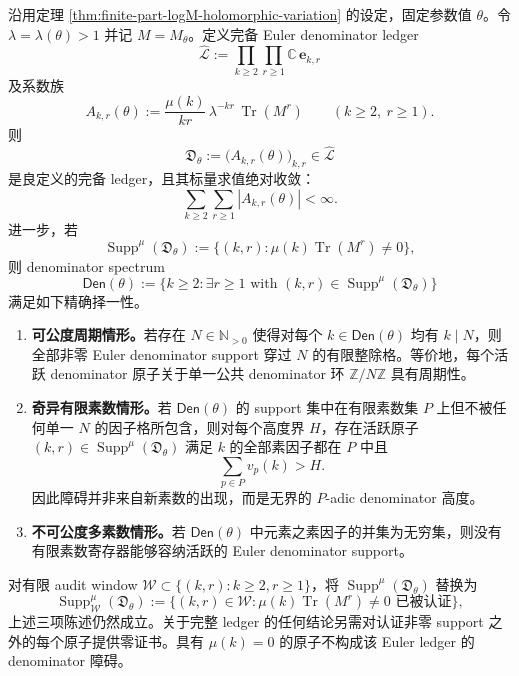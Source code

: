 \begin{theorem}\label{distill:euclid_elements-proportion_and_denominator_spectrum_families-zeta-completed-denominator-ledger-alternative}
沿用定理 \ref{thm:finite-part-logM-holomorphic-variation} 的设定，固定参数值 \(\theta\)。令 \(\lambda=\lambda(\theta)>1\) 并记 \(M=M_\theta\)。定义完备 Euler denominator ledger
\[
\widehat{\mathcal L}:=\prod_{k\ge2}\prod_{r\ge1}\mathbb C\,\mathbf e_{k,r}
\]
及系数族
\[
A_{k,r}(\theta):=\frac{\mu(k)}{kr}\,\lambda^{-kr}\,\operatorname{Tr}(M^r)
\qquad(k\ge2,\ r\ge1).
\]
则
\[
\mathfrak D_\theta:=\bigl(A_{k,r}(\theta)\bigr)_{k,r}\in\widehat{\mathcal L}
\]
是良定义的完备 ledger，且其标量求值绝对收敛：
\[
\sum_{k\ge2}\sum_{r\ge1}|A_{k,r}(\theta)|<\infty.
\]
进一步，若
\[
\operatorname{Supp}^{\mu}(\mathfrak D_\theta):=\bigl\{(k,r):\mu(k)\operatorname{Tr}(M^r)\ne0\bigr\},
\]
则 denominator spectrum
\[
\mathsf{Den}(\theta):=\bigl\{k\ge2:\exists r\ge1\text{ with }(k,r)\in\operatorname{Supp}^{\mu}(\mathfrak D_\theta)\bigr\}
\]
满足如下精确择一性。
\begin{enumerate}
  \item \textbf{可公度周期情形。}若存在 \(N\in\mathbb N_{>0}\) 使得对每个 \(k\in\mathsf{Den}(\theta)\) 均有 \(k\mid N\)，则全部非零 Euler denominator support 穿过 \(N\) 的有限整除格。等价地，每个活跃 denominator 原子关于单一公共 denominator 环 \(\mathbb Z/N\mathbb Z\) 具有周期性。
  \item \textbf{奇异有限素数情形。}若 \(\mathsf{Den}(\theta)\) 的 support 集中在有限素数集 \(P\) 上但不被任何单一 \(N\) 的因子格所包含，则对每个高度界 \(H\)，存在活跃原子 \((k,r)\in\operatorname{Supp}^{\mu}(\mathfrak D_\theta)\) 满足 \(k\) 的全部素因子都在 \(P\) 中且
  \[
  \sum_{p\in P}v_p(k)>H.
  \]
  因此障碍并非来自新素数的出现，而是无界的 \(P\)-adic denominator 高度。
  \item \textbf{不可公度多素数情形。}若 \(\mathsf{Den}(\theta)\) 中元素之素因子的并集为无穷集，则没有有限素数寄存器能够容纳活跃的 Euler denominator support。
\end{enumerate}
对有限 audit window \(\mathcal W\subset\{(k,r):k\ge2,r\ge1\}\)，将 \(\operatorname{Supp}^{\mu}(\mathfrak D_\theta)\) 替换为
\[
\operatorname{Supp}^{\mu}_{\mathcal W}(\mathfrak D_\theta)
:=\bigl\{(k,r)\in\mathcal W:\mu(k)\operatorname{Tr}(M^r)\ne0\text{ 已被认证}\bigr\},
\]
上述三项陈述仍然成立。关于完整 ledger 的任何结论另需对认证非零 support 之外的每个原子提供零证书。具有 \(\mu(k)=0\) 的原子不构成该 Euler ledger 的 denominator 障碍。
\end{theorem}
